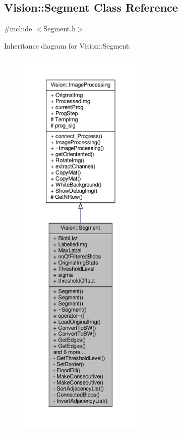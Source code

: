 \hypertarget{class_vision_1_1_segment}{}\subsection{Vision\+:\+:Segment Class Reference}
\label{class_vision_1_1_segment}


{\ttfamily \#include $<$Segment.\+h$>$}



Inheritance diagram for Vision\+:\+:Segment\+:
\nopagebreak
\begin{figure}[H]
\begin{center}
\leavevmode
\includegraphics[height=550pt]{class_vision_1_1_segment__inherit__graph}
\end{center}
\end{figure}


